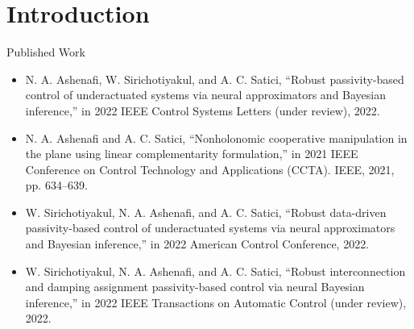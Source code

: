 \section{Introduction}


\begin{frame}{Published Work}
    \begin{itemize}
        \item N. A. Ashenafi, W. Sirichotiyakul, and A. C. Satici, “Robust passivity-based control of underactuated systems via neural approximators and Bayesian inference,” in 2022 IEEE Control Systems Letters (under review), 2022. 
        \item N. A. Ashenafi and A. C. Satici, “Nonholonomic cooperative manipulation in the plane using linear complementarity formulation,” in 2021 IEEE Conference on Control Technology and Applications (CCTA). IEEE, 2021, pp. 634–639. 
        \item W. Sirichotiyakul, N. A. Ashenafi, and A. C. Satici, “Robust data-driven passivity-based control of underactuated systems via neural approximators and Bayesian inference,” in 2022 American Control Conference, 2022. 
        \item W. Sirichotiyakul, N. A. Ashenafi, and A. C. Satici, “Robust interconnection and damping assignment passivity-based control via neural Bayesian inference,” in 2022 IEEE Transactions on Automatic Control (under review), 2022.
    \end{itemize}
\end{frame}

